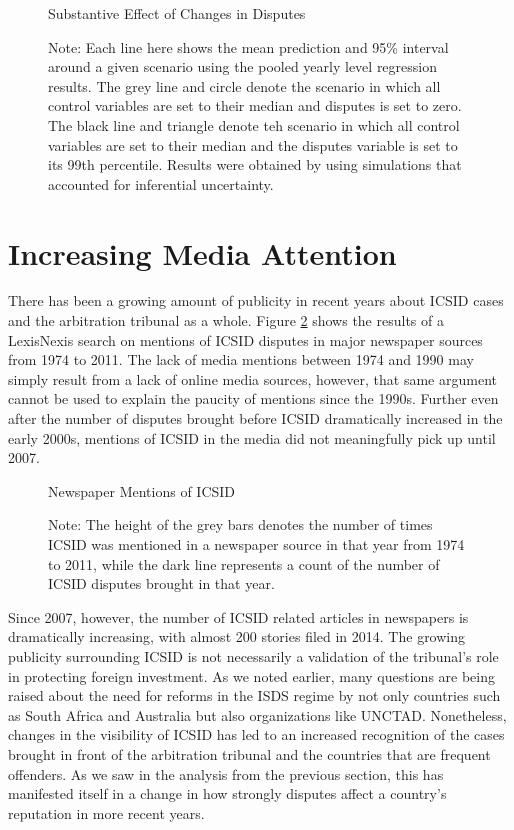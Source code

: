 \documentclass[12pt,onesided]{amsart}
\begin{document}
\begin{figure}[ht]
	\vspace{4cm}
	\centering
	\caption{Substantive Effect of Changes in Disputes}
	\label{fig:dispEffectYearSim}
	\resizebox{1\textwidth}{!}{}
	\caption*{Note: Each line here shows the mean prediction and 95\% interval around a given scenario using the pooled yearly level regression results. The grey line and circle denote the scenario in which all control variables are set to their median and disputes is set to zero. The black line and triangle denote teh scenario in which all control variables are set to their median and the disputes variable is set to its 99th percentile. Results were obtained by using simulations that accounted for inferential uncertainty. }
\end{figure}


\section*{Increasing Media Attention}

There has been a growing amount of publicity in recent years about ICSID cases and the arbitration tribunal as a whole. Figure \ref{fig:icsidMedia} shows the results of a LexisNexis search on mentions of ICSID disputes in major newspaper sources from 1974 to 2011. The lack of media mentions between 1974 and 1990 may simply result from a lack of online media sources, however, that same argument cannot be used to explain the paucity of mentions since the 1990s. Further even after the number of disputes brought before ICSID dramatically increased in the early 2000s, mentions of ICSID in the media did not meaningfully pick up until 2007. 

\begin{figure}[ht]
	\vspace{4cm}
	\centering
	\caption{Newspaper Mentions of ICSID}
	\label{fig:icsidMedia}
	\resizebox{1\textwidth}{!}{}
	\caption*{Note: The height of the grey bars denotes the number of times ICSID was mentioned in a newspaper source in that year from 1974 to 2011, while the dark line represents a count of the number of ICSID disputes brought in that year.}
\end{figure}

Since 2007, however, the number of ICSID related articles in newspapers is dramatically increasing, with almost 200 stories filed in 2014. The growing publicity surrounding ICSID is not necessarily a validation of the tribunal's role in protecting foreign investment. As we noted earlier, many questions are being raised about the need for reforms in the ISDS regime by not only countries such as South Africa and Australia but also organizations like UNCTAD. Nonetheless, changes in the visibility of ICSID has led to an increased recognition of the cases brought in front of the arbitration tribunal and the countries that are frequent offenders. As we saw in the analysis from the previous section, this has manifested itself in a change in how strongly disputes affect a country's reputation in more recent years.
\end{document}
